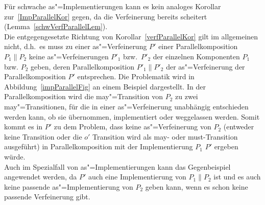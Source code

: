 Für schwache as"=Implementierungen kann es kein analoges Korollar
zur~\ref{ImpParallelKor} gegen, da die Verfeinerung bereits scheitert
(Lemma~\ref{schwVerfParallelLem}).\\
Die entgegengesetzte Richtung von Korollar~\ref{verfParallelKor} gilt im
allgemeinen nicht, d.h.\ es muss zu einer as"=Verfeinerung $P'$ einer
Parallelkomposition $P_1\|P_2$ keine as"=Verfeinerungen $P'_1$ bzw.\
$P'_2$ der einzelnen Komponenten $P_1$ bzw. $P_2$ geben, deren
Parallelkomposition $P'_1\|P'_2$ der as"=Verfeinerung der Parallelkomposition
$P'$ entsprechen. Die Problematik wird in Abbildung~\ref{impParallelFig} an
einem Beispiel dargestellt. In der Parallelkomposition wird die may"=Transition
von $P_2$ zu zwei may"=Transitionen, für die in einer as"=Verfeinerung
unabhängig entschieden werden kann, ob sie übernommen, implementiert oder
weggelassen werden. Somit kommt es in $P'$ zu dem Problem, dass keine
as"=Verfeinerung von $P_2$ (entweder keine Transition oder die $o'$ Transition
wird als may- oder must-Transition ausgeführt) in Parallelkomposition mit der
Implementierung $P_1$ $P'$ ergeben würde.\\
Auch im Spezialfall von as"=Implementierungen kann das Gegenbeispiel angewendet
werden, da $P'$ auch eine Implementierung von $P_1\|P_2$ ist und es auch keine
passende as"=Implementierung von $P_2$ geben kann, wenn es schon keine passende
Verfeinerung gibt.

